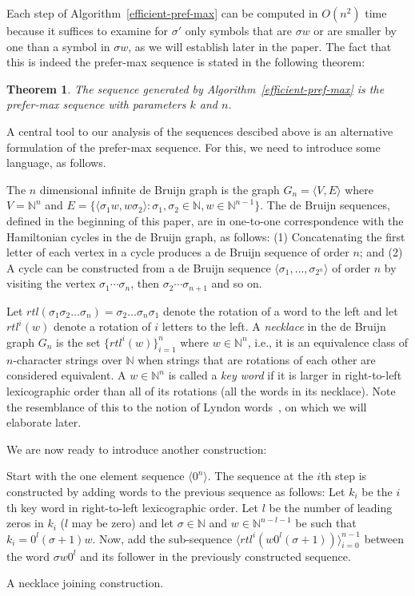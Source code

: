 \documentclass{article}
\newtheorem{theorem}{Theorem}
\theoremstyle{definition}
\newcommand{\N}{{\mathbb{N}}}
\newcommand{\T}[1]{\langle{#1}\rangle}
\begin{document}
Each step of Algorithm~\ref{efficient-pref-max} can be computed in $O(n^2)$ time because it suffices to examine for $\sigma'$ only symbols that are $\sigma w$ or are smaller by one than a symbol in $\sigma w$, as we will establish later in the paper.
The fact that this is indeed the prefer-max sequence is stated in the following theorem:

\begin{theorem}
	The sequence generated by Algorithm~\ref{efficient-pref-max} is the prefer-max sequence with parameters $k$ and $n$.
\end{theorem}
	

A central tool to our analysis of the sequences descibed above is an alternative formulation of the prefer-max sequence. For this, we need to introduce some language, as follows.

The $n$ dimensional infinite de Bruijn graph is the graph $G_{n}=\T{V,E}$ where $V=\N^n$ and $E=\{ \T{\sigma_1 w, w \sigma_2} \colon \sigma_1,\sigma_2\in\N, w \in \N^{n-1}\}$. The de Bruijn sequences, defined in the beginning of this paper, are in one-to-one correspondence with the Hamiltonian cycles in the de Bruijn graph, as follows: (1) Concatenating the first letter of each vertex in a cycle produces a de Bruijn sequence of order $n$; and (2) A cycle can be constructed from a de Bruijn sequence $\T{\sigma_1,\dots,\sigma_{2^n}}$ of order $n$ by visiting the vertex $\sigma_1\cdots\sigma_n$, then $\sigma_2\cdots\sigma_{n+1}$ and so on.

Let $rtl(\sigma_1\sigma_2\dots\sigma_n) = \sigma_2\dots\sigma_n\sigma_1$ denote the rotation of a word to the left and let $rtl^i(w)$ denote a rotation of $i$ letters to the left. A \emph{necklace} in the de Bruijn graph $G_n$ is the set $\{rtl^i(w)\}_{i=1}^n$ where $w \in \N^n$, i.e., it is an equivalence class of $n$-character strings over $\N$ when strings that are rotations of each other are considered equivalent. A $w\in\N^n$ is called a \emph{key word} if it is larger in right-to-left lexicographic order than all of its rotations (all the words in its necklace).  Note the resemblance of this to the notion of Lyndon words~\cite{??}, on which we will elaborate later.

We are now ready to introduce another construction:


\begin{algorithm}[!h]
	Start with the one element sequence $\T{0^n}$. The sequence at the $i$th step is constructed by adding words to the previous sequence as follows: Let $k_i$ be the $i$th key word in right-to-left lexicographic order. Let $l$ be the number of leading zeros in $k_i$ ($l$ may be zero) and let $\sigma \in \N$ and $w\in\N^{n-l-1}$ be such that $k_i=0^l(\sigma+1)w$. Now, add the sub-sequence $\T{rtl^i(w0^l(\sigma+1))}_{i=0}^{n-1}$ between the word $\sigma w 0^l$ and its follower in the previously constructed sequence.
	\caption{A necklace joining construction.}
	\label{necklace-joining}
\end{algorithm}
\end{document}
